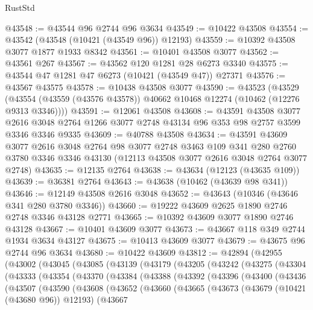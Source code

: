 \begin{lexlean}{RustStd}
\begin{coremodule}
@43548 := @43544 @96 @2744 @96 @3634
@43549 := @10422 @43508
@43554 := @43542 (@43548 (@10421 (@43549 @96)) @12193)
@43559 := @10392 @43508 @3077 @1877 @1933 @8342
@43561 := @10401 @43508 @3077
@43562 := @43561 @267
@43567 := @43562 @120 @1281 @28 @6273 @3340
@43575 := @43544 @47 @1281 @47 @6273 (@10421 (@43549 @47)) @27371
@43576 := @43567 @43575
@43578 := @10438 @43508 @3077
@43590 := @43523
    (@43529 (@43554 (@43559 (@43576 @43578)) @40662 @10468 @12274 (@10462 (@12276 @9313 @3346))))
@43591 := @12061 @43508
@43608 := @43591
    @43508
    @3077
    @2616
    @3048
    @2764
    @1266
    @3077
    @2748
    @43134
    @96
    @353
    @98
    @2757
    @3599
    @3346
    @3346
    @9335
@43609 := @40788 @43508
@43634 := @43591
    @43609
    @3077
    @2616
    @3048
    @2764
    @98
    @3077
    @2748
    @3463
    @109
    @341
    @280
    @2760
    @3780
    @3346
    @3346
    @43130
    (@12113 @43508 @3077 @2616 @3048 @2764 @3077 @2748)
@43635 := @12135 @2764
@43638 := @43634 (@12123 (@43635 @109))
@43639 := @36381 @2764
@43643 := @43638 (@10462 (@43639 @98 @341))
@43646 := @12149 @43508 @2616 @3048
@43652 := @43643 (@10346 (@43646 @341 @280 @3780 @3346))
@43660 := @19222 @43609 @2625 @1890 @2746 @2748 @3346 @43128 @2771
@43665 := @10392 @43609 @3077 @1890 @2746 @43128
@43667 := @10401 @43609 @3077
@43673 := @43667 @118 @349 @2744 @1934 @3634 @43127
@43675 := @10413 @43609 @3077
@43679 := @43675 @96 @2744 @96 @3634
@43680 := @10422 @43609
@43812 := @42894
    (@42955
      (@43002
        (@43045
          (@43085
            (@43139
              (@43179
                (@43205
                  (@43242
                    (@43275
                      (@43304
                        (@43333
                          (@43354
                            (@43370
                              (@43384
                                (@43388
                                  (@43392
                                    (@43396
                                      (@43400
                                        (@43436
                                          (@43507
                                            (@43590
                                              (@43608
                                                (@43652
                                                  (@43660
                                                    (@43665
                                                      (@43673
                                                        (@43679 (@10421 (@43680 @96)) @12193)
                                                        (@43667

\end{coremodule}
\end{lexlean}

